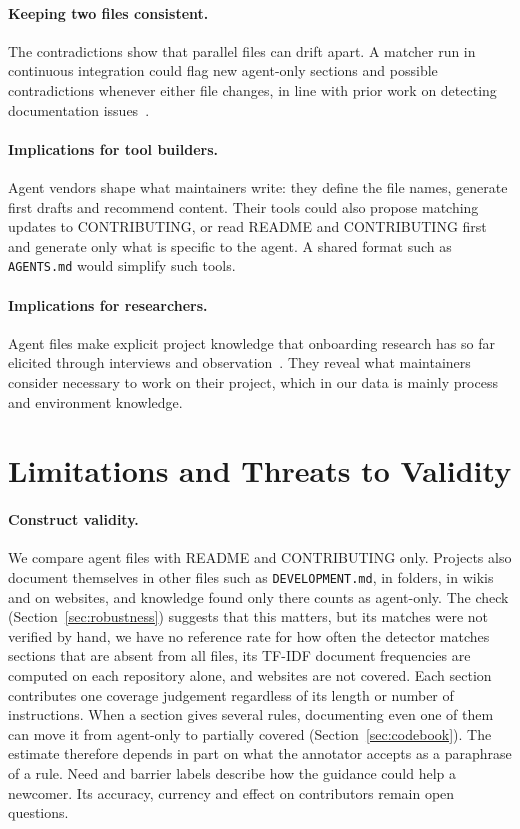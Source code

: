 \documentclass[sigconf,nonacm]{acmart}
\begin{document}
\paragraph{Keeping two files consistent.} The \nConflictUnits{} contradictions show that parallel
files can drift apart. A matcher run in continuous integration could flag new agent-only sections
and possible contradictions whenever either file changes, in line with prior work on detecting
documentation issues~\cite{aghajani2019issues}.

\paragraph{Implications for tool builders.} Agent vendors shape what maintainers write: they define
the file names, generate first drafts and recommend content. Their tools could also propose matching
updates to CONTRIBUTING, or read README and CONTRIBUTING first and generate only what is specific to
the agent. A shared format such as \texttt{AGENTS.md} would simplify such tools.

\paragraph{Implications for researchers.} Agent files make explicit project knowledge that
onboarding research has so far elicited through interviews and
observation~\cite{dagenais2010landscape,steinmacher2015social}. They reveal what maintainers
consider necessary to work on their project, which in our data is mainly process and environment
knowledge.

\section{Limitations and Threats to Validity}\label{sec:limitations}

\paragraph{Construct validity.} We compare agent files with README and CONTRIBUTING only. Projects
also document themselves in other files such as \texttt{DEVELOPMENT.md}, in  folders, in
wikis and on websites, and knowledge found only there counts as agent-only. The  check
(Section~\ref{sec:robustness}) suggests that this matters, but its matches were not verified by hand,
we have no reference rate for how often the detector matches sections that are absent from all
files, its TF-IDF document frequencies are computed on each repository alone, and websites are not
covered. Each section contributes one coverage judgement regardless of its length or number of
instructions. When a section gives several rules, documenting even one of them can move it from
agent-only to partially covered (Section~\ref{sec:codebook}). The estimate therefore depends in
part on what the annotator accepts as a paraphrase of a rule. Need and barrier labels describe how
the guidance could help a newcomer. Its accuracy, currency and effect on contributors remain open
questions.
\end{document}
